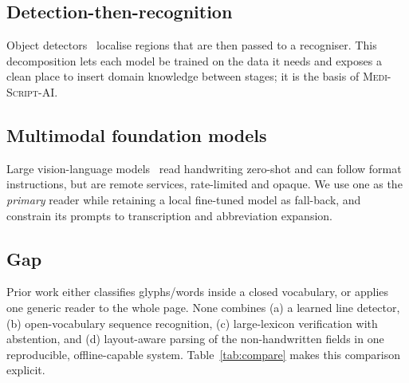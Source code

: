 \documentclass[journal]{IEEEtran}
\newcommand{\sys}{\textsc{Medi-Script-AI}}
\begin{document}
\subsection{Detection-then-recognition}
Object detectors~\cite{redmon2016yolo,jocher2023yolov8} localise regions that are then passed to a recogniser. This decomposition lets each model be trained on the data it needs and exposes a clean place to insert domain knowledge between stages; it is the basis of \sys.

\subsection{Multimodal foundation models}
Large vision-language models~\cite{gemini2023} read handwriting zero-shot and can follow format instructions, but are remote services, rate-limited and opaque. We use one as the \emph{primary} reader while retaining a local fine-tuned model as fall-back, and constrain its prompts to transcription and abbreviation expansion.

\subsection{Gap}
Prior work either classifies glyphs/words inside a closed vocabulary, or applies one generic reader to the whole page. None combines (a) a learned line detector, (b) open-vocabulary sequence recognition, (c) large-lexicon verification with abstention, and (d) layout-aware parsing of the non-handwritten fields in one reproducible, offline-capable system. Table~\ref{tab:compare} makes this comparison explicit.
\end{document}
